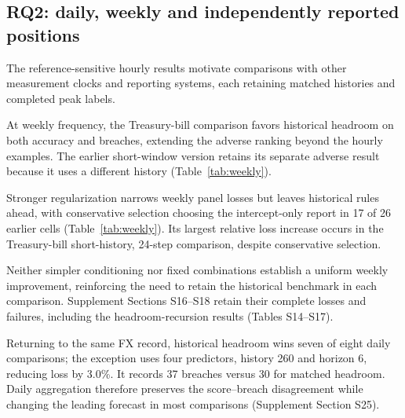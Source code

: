\documentclass[11pt,a4paper]{article}
\begin{document}
\subsection{RQ2: daily, weekly and independently reported positions}

The reference-sensitive hourly results motivate comparisons with other measurement clocks and reporting systems, each retaining matched histories and completed peak labels.

At weekly frequency, the Treasury-bill comparison favors historical headroom on both accuracy and breaches, extending the adverse ranking beyond the hourly examples. The earlier short-window version retains its separate adverse result because it uses a different history (Table~\ref{tab:weekly}).

Stronger regularization narrows weekly panel losses but leaves historical rules ahead, with conservative selection choosing the intercept-only report in 17 of 26 earlier cells (Table~\ref{tab:weekly}). Its largest relative loss increase occurs in the Treasury-bill short-history, 24-step comparison, despite conservative selection.

Neither simpler conditioning nor fixed combinations establish a uniform weekly improvement, reinforcing the need to retain the historical benchmark in each comparison. Supplement Sections S16--S18 retain their complete losses and failures, including the headroom-recursion results (Tables S14--S17).

Returning to the same FX record, historical headroom wins seven of eight daily comparisons; the exception uses four predictors, history 260 and horizon 6, reducing loss by 3.0\%. It records 37 breaches versus 30 for matched headroom. Daily aggregation therefore preserves the score--breach disagreement while changing the leading forecast in most comparisons (Supplement Section S25).
\end{document}
